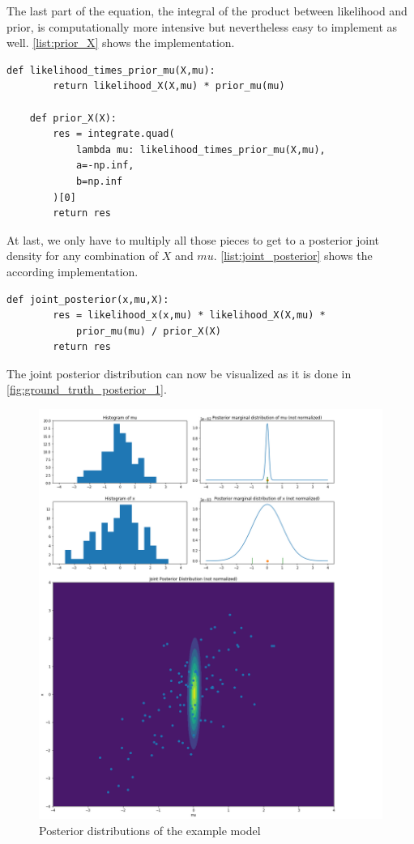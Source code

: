 \documentclass{article}
\begin{document}
The last part of the equation, the integral of the product between likelihood and prior, is computationally more intensive but nevertheless easy to implement as well. \autoref{list:prior_X} shows the implementation.
\begin{lstlisting}[caption={Implementation of the prior for X}, label={list:prior_X},captionpos=b]
    def likelihood_times_prior_mu(X,mu):
        return likelihood_X(X,mu) * prior_mu(mu)
	
    def prior_X(X):
        res = integrate.quad(
            lambda mu: likelihood_times_prior_mu(X,mu),
            a=-np.inf,
            b=np.inf
        )[0]
        return res
\end{lstlisting}
At last, we only have to multiply all those pieces to get to a posterior joint density for any combination of $X$ and $mu$. \autoref{list:joint_posterior} shows the according implementation.
\begin{lstlisting}[caption={Implementation of the joint posterior distribution}, label={list:joint_posterior},captionpos=b]
    def joint_posterior(x,mu,X):
        res = likelihood_x(x,mu) * likelihood_X(X,mu) * 
            prior_mu(mu) / prior_X(X)
        return res
\end{lstlisting}
The joint posterior distribution can now be visualized as it is done in \autoref{fig:ground_truth_posterior_1}.
\begin{figure}
	\includegraphics[width=\textwidth]{images/ground_truth_posterior_1_cut.png}
	\caption[Posterior distributions of the example model]{Posterior distributions of the example model}
	\label{fig:ground_truth_posterior_1}
\end{figure}
\end{document}
